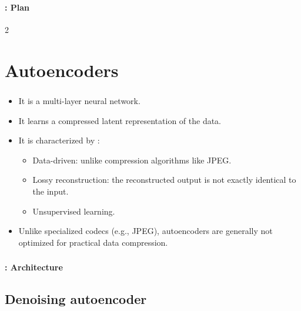 \documentclass[xcolor=table]{beamer}
\begin{document}
	\begin{frame}
		\frametitle{\inserttitle}
		\framesubtitle{\insertshortsubtitle: Plan}
		
		\begin{multicols}{2}
			\tableofcontents
		\end{multicols}
	\end{frame}
	
	\section{Autoencoders}
	
	\begin{frame}
		\frametitle{\insertshortsubtitle}
		\framesubtitle{\insertsection}
		
		\begin{itemize}
			\item It is a multi-layer neural network.
			\item It learns a compressed latent representation of the data.
			\item It is characterized by \cite{2016-keras}:
			\begin{itemize}
				\item Data-driven: unlike compression algorithms like JPEG.
				\item Lossy reconstruction: the reconstructed output is not exactly identical to the input.
				\item Unsupervised learning.
			\end{itemize}
			\item Unlike specialized codecs (e.g., JPEG), autoencoders are generally not optimized for practical data compression.
		\end{itemize}
		
	\end{frame}
	
	\begin{frame}
		\frametitle{\insertshortsubtitle}
		\framesubtitle{\insertsection: Architecture}
		
		\hgraphpage[\textwidth]{AE.pdf}
		
	\end{frame}
	
	\subsection{Denoising autoencoder}
	
\end{document}
